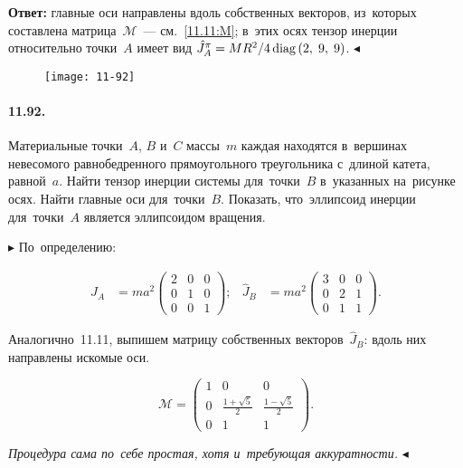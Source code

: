 \documentclass{weekly}
\begin{document}
\textbf{Ответ:}
главные оси направлены вдоль собственных векторов, из~которых
составлена матрица~$\mathcal{M}$~--- см.~\eqref{11.11:M};
в~этих осях тензор инерции относительно точки~$A$ имеет вид
$\hat J_A^\pi = MR^2/4 \operatorname{diag} \left(2, \; 9, \; 9\right)$.
\hfill $\blacktriangleleft$


\clearpage
\begin{wrapfigure}[6]{r}{.2\textwidth}
    \texttt{[image: 11-92]}
\end{wrapfigure}
\paragraph{11.92.} Материальные точки~$A$, $B$ и~$C$ массы~$m$ каждая
находятся в~вершинах невесомого равнобедренного прямоугольного
треугольника с~длиной катета, равной~$a$. Найти тензор инерции системы
для~точки~$B$ в~указанных на~рисунке осях. Найти главные оси
для~точки~$B$. Показать, что~эллипсоид инерции для~точки~$A$
является эллипсоидом вращения.

$\blacktriangleright$ По~определению:
\begin{small}
\begin{align}
    \hat J_A &= ma^2 \begin{pmatrix}
        2 & 0 & 0 \\
        0 & 1 & 0 \\
        0 & 0 & 1
    \end{pmatrix};
&
    \hat J_B &= ma^2 \begin{pmatrix}
        3 & 0 & 0 \\
        0 & 2 & 1 \\
        0 & 1 & 1
    \end{pmatrix}.
\end{align}
\end{small}%
Аналогично~11.11, выпишем матрицу собственных векторов~$\hat J_B$:
вдоль них направлены искомые оси.
\begin{small}
\begin{equation}
    \mathcal{M} = \begin{pmatrix}
        1 & 0 & 0 \\
        0 & \frac{1 + \sqrt{5}}{2} & \frac{1 - \sqrt{5}}{2} \\
        0 & 1 & 1
    \end{pmatrix}.
\end{equation}
\end{small}%
\emph{Процедура сама по~себе простая, хотя и~требующая аккуратности.}
\hfill $\blacktriangleleft$
\end{document}
